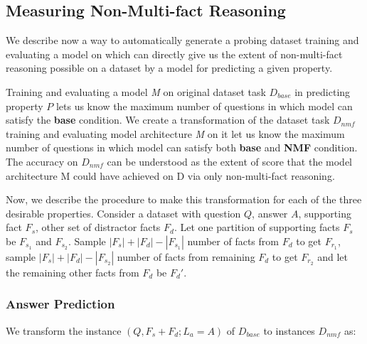\subsection{Measuring Non-Multi-fact Reasoning}

We describe now a way to automatically generate a probing dataset training and evaluating a model on which can directly give us the extent of non-multi-fact reasoning possible on a dataset by a model for predicting a given property. 

Training and evaluating a model {\it M} on original dataset task $D_{base}$ in predicting property $P$ lets us know the maximum number of questions in which model can satisfy the \textbf{base} condition. We create a transformation of the dataset task $D_{nmf}$ training and evaluating model architecture {\it M} on it let us know the maximum number of questions in which model can satisfy both \textbf{base} and \textbf{NMF} condition. The accuracy on $D_{nmf}$ can be understood as the extent of score that the model architecture M could have achieved on D via only non-multi-fact reasoning. 


Now, we describe the procedure to make this transformation for each of the three desirable properties. Consider a dataset with question $Q$, answer $A$, supporting fact $F_s$, other set of distractor facts $F_d$. Let one partition of supporting facts $F_s$ be $F_{s_1}$ and $F_{s_2}$. Sample $|F_s| + |F_d| - |F_{s_1}|$ number of facts from $F_d$ to get $F_{r_1}$, sample $|F_s| + |F_d| - |F_{s_2}|$ number of facts from remaining $F_d$ to get $F_{r_2}$ and let the remaining other facts from $F_d$ be $F_d'$.

\subsubsection{Answer Prediction}

We transform the instance $(Q, F_s + F_d; L_a=A)$ of $D_{base}$ to instances $D_{nmf}$ as:


